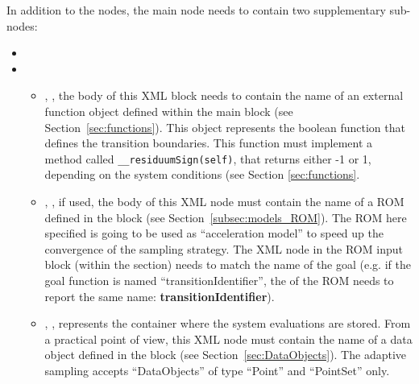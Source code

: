  In addition to the  nodes, the main
 node needs to contain two supplementary
sub-nodes:

\begin{itemize}
  \item \convergenceDescription
  \item {}
    \begin{itemize}
      \item {}, ,  the
        body of this XML block needs to contain the name of an external
        function object defined within the  main block (see
        Section~\ref{sec:functions}).
        This object represents the boolean function that defines the transition
        boundaries.
        This function must implement a method called
        \texttt{\_\_residuumSign(self)}, that returns either -1 or 1, depending
        on the system conditions (see Section \ref{sec:functions}.
      \item {}, , if used, the
        body of this XML node must contain the name of a ROM defined in the
         block (see Section~\ref{subsec:models_ROM}). The ROM
        here specified is going to be used as ``acceleration model'' to speed up the
        convergence of the sampling strategy. The  XML node in the ROM
        input block (within the  section) needs to match the name of the goal
         (e.g. if the goal function is named ``transitionIdentifier'', the  of the
        ROM needs to report the same name: \textbf{transitionIdentifier}).
      \item {}, ,
        represents the container where the system evaluations are stored.
        From a practical point of view, this XML node must contain the name of
        a data object defined in the  block (see
        Section~\ref{sec:DataObjects}).
        The adaptive sampling accepts ``DataObjects'' of type ``Point'' and
        ``PointSet'' only.
    \end{itemize}
\end{itemize}


